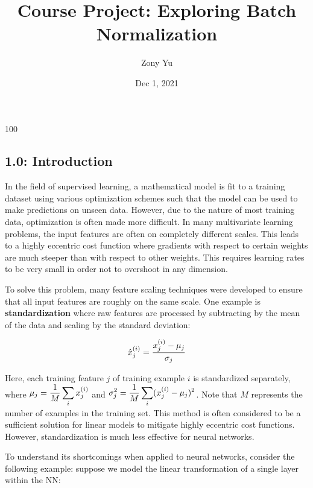 \documentclass{article}
\title{Course Project: Exploring Batch Normalization}
\author{Zony Yu}
\date{Dec 1, 2021}
\begin{document}
100%
\begin{multicols}{2}









\section*{1.0: Introduction}
In the field of supervised learning, a mathematical model is fit to 
a training dataset using various optimization schemes such that the model 
can be used to make predictions on unseen data. However, 
due to the nature of most training data, optimization is often made more 
difficult. In many multivariate learning problems, the input features are
often on completely different scales. This leads to a highly eccentric cost
function where gradients with respect to certain weights are much steeper
than with respect to other weights. This requires learning rates to 
be very small in order not to overshoot in any dimension.

To solve this problem, many feature scaling techniques were developed to ensure
that all input features are roughly on the same scale. One example is \textbf{standardization}
where raw features are processed by subtracting by the mean of the data and 
scaling by the standard deviation:

\begin{equation}
    \hat{x}_j^{(i)} = {x^{(i)}_j - \mu_j \over \sigma_j} \notag
\end{equation}

Here, each training feature $j$ of training example $i$ is standardized separately, 
where $\begin{aligned}
    \mu_j = {1\over M}\sum_i x^{(i)}_j
\end{aligned}$ and $\begin{aligned}
    \sigma^2_j = {1\over M}\sum_i (x^{(i)}_j - \mu_j)^2
\end{aligned}$. Note that $M$ represents the number of examples in the 
training set. This method is often considered to be a sufficient solution 
for linear models to mitigate highly eccentric cost functions. However, 
standardization is much less effective for neural networks.

To understand its shortcomings when applied to neural networks, consider
the following example: suppose we model the linear transformation 
of a single layer within the NN:


\end{multicols}
\end{document}
